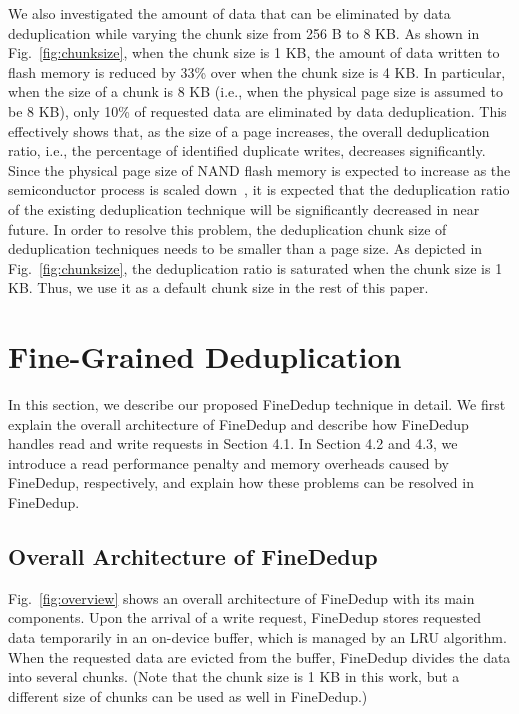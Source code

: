 We also investigated the amount of data that can be eliminated by data deduplication 
while varying the chunk size from 256 B to 8 KB.
As shown in Fig.~\ref{fig:chunksize}, 
when the chunk size is 1 KB, 
the amount of data written to flash memory is reduced by 33\% over when the chunk size is 4 KB.
In particular, when the size of a chunk is 8 KB (i.e., when the physical page size is assumed to be 8 KB),
only 10\% of requested data are eliminated by data deduplication.
This effectively shows that, as the size of a page increases,
the overall deduplication ratio, i.e., the percentage of identified duplicate writes, decreases significantly.
Since the physical page size of NAND flash memory is expected to increase as the semiconductor process is scaled down~\cite{tlc,16kpage},
it is expected that the deduplication ratio of the existing deduplication technique will be significantly 
decreased in near future.
In order to resolve this problem, the deduplication chunk size of deduplication techniques needs to be smaller than a page size.
As depicted in Fig.~\ref{fig:chunksize}, 
the deduplication ratio is saturated when the chunk size is 1 KB.
Thus, we use it as a default chunk size in the rest of this paper.

\section{Fine-Grained Deduplication}

In this section, we describe our proposed FineDedup technique in detail.
We first explain the overall architecture of FineDedup and 
describe how FineDedup handles read and write requests in Section 4.1.
In Section 4.2 and 4.3,
we introduce a read performance penalty and memory overheads caused by FineDedup, respectively,
and explain how these problems can be resolved in FineDedup.

\subsection{Overall Architecture of FineDedup}

Fig.~\ref{fig:overview} shows an overall architecture of FineDedup with its main components.
Upon the arrival of a write request,
FineDedup stores requested data temporarily in an on-device buffer,
which is managed by an LRU algorithm.
When the requested data are evicted from the buffer,
FineDedup divides the data into several chunks.
(Note that the chunk size is 1 KB in this work, 
but a different size of chunks can be used as well in FineDedup.)

